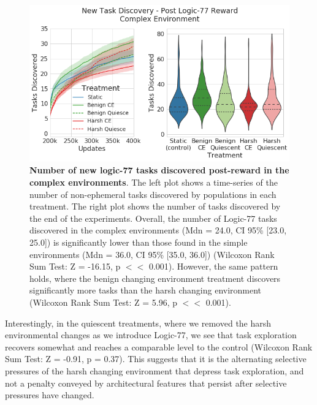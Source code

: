 \documentclass[PhD]{msu-thesis}
\begin{document}
	\begin{figure}[!h]
	\includegraphics[width=0.95\columnwidth]{figures/LTE/lte-complex-post_reward_task_discovery.png}
	\caption{\textbf{Number of new logic-77 tasks discovered post-reward in the complex environments}. The left plot shows a time-series of the number of non-ephemeral tasks discovered by populations in each treatment. The right plot shows the number of tasks discovered by the end of the experiments. Overall, the number of Logic-77 tasks discovered in the complex environments (Mdn = 24.0, CI 95\% [23.0, 25.0]) is significantly lower than those found in the simple environments (Mdn = 36.0, CI 95\% [35.0, 36.0]) (Wilcoxon Rank Sum Test: Z = -16.15, p $<<$ 0.001). However, the same pattern holds, where the benign changing environment treatment discovers significantly more tasks than the harsh changing environment (Wilcoxon Rank Sum Test: Z = 5.96, p $<<$ 0.001).%
	}
	\label{fig:complex-task_discovery}
	\end{figure}

Interestingly, in the quiescent treatments, where we removed the harsh environmental changes as we introduce Logic-77, we see that task exploration recovers somewhat and reaches a comparable level to the control (Wilcoxon Rank Sum Test: Z = -0.91, p = 0.37). This suggests that it is the alternating selective pressures of the harsh changing environment that depress task exploration, and not a penalty conveyed by architectural features that persist after selective pressures have changed.
\end{document}

